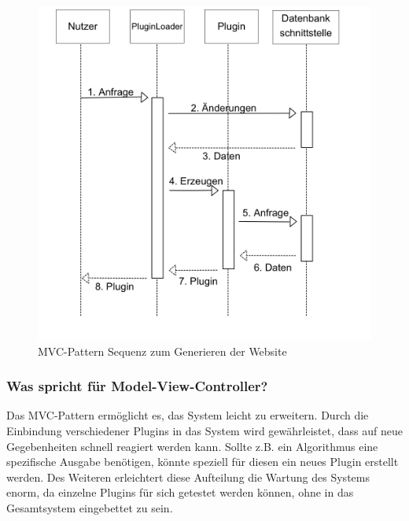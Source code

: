 \begin{figure}
	\vspace{-20pt}
	\begin{center}
		\includegraphics[width=1\linewidth]{Grafik/Diagramm/Pattern/MVC/Sequenzdiagramm.png}
	\end{center}
	\vspace{-15pt}
	\caption[MVC Website Sequenz]{MVC-Pattern Sequenz zum Generieren der Website}
	\label{fig:MVC}
	\vspace{-50pt}
\end{figure}

\subsubsection{Was spricht für Model-View-Controller?}
Das MVC-Pattern ermöglicht es, das System leicht zu erweitern. 
Durch die Einbindung verschiedener Plugins in das System wird gewährleistet, dass auf neue Gegebenheiten schnell reagiert werden kann.
Sollte z.B. ein Algorithmus eine spezifische Ausgabe benötigen, könnte speziell für diesen ein neues Plugin erstellt werden. 
Des Weiteren erleichtert diese Aufteilung die Wartung des Systems enorm, da einzelne Plugins für sich getestet werden können, ohne in das Gesamtsystem eingebettet zu sein. 

